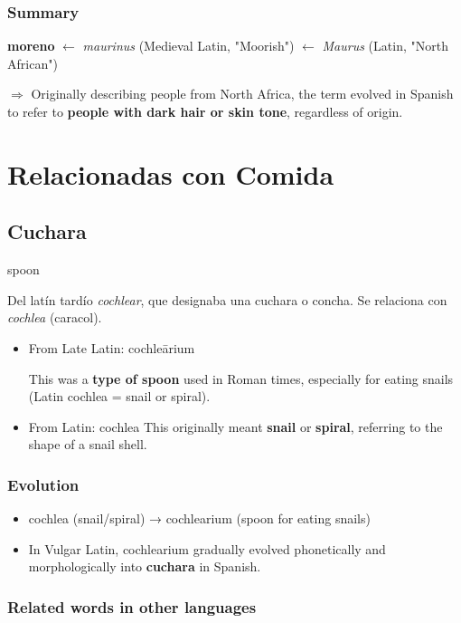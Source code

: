 \documentclass[10pt]{book}
\newcommand{\wordentry}[2]{
	\large #1
	\vspace{-0.5em}
	\begin{etymologybox}
		#2
	\end{etymologybox}
}
\let\oldsection\section
\renewcommand{\section}[1]{
	\needspace{8\baselineskip}
	\oldsection{#1}
}
\begin{document}
	\subsection*{Summary}
	\textbf{moreno} $\leftarrow$ \textit{maurinus} (Medieval Latin, "Moorish") $\leftarrow$ \textit{Maurus} (Latin, "North African")
	
	$\Rightarrow$ Originally describing people from North Africa, the term evolved in Spanish to refer to \textbf{people with dark hair or skin tone}, regardless of origin.
	
	
	\chapter{Relacionadas con Comida}
	
	\section{Cuchara}
	\wordentry{spoon}{
	Del latín tardío \textit{cochlear}, que designaba una cuchara o concha. Se relaciona con \textit{cochlea} (caracol).
	\begin{itemize}
		\item From Late Latin: cochleārium
		
		This was a \textbf{type of spoon} used in Roman times, especially for eating snails (Latin cochlea = snail or spiral).
		
		\item From Latin: cochlea
		This originally meant \textbf{snail} or \textbf{spiral}, referring to the shape of a snail shell.
	\end{itemize}
	}
	
	\subsection*{Evolution}
	\begin{itemize}
		\item cochlea (snail/spiral) → cochlearium (spoon for eating snails)
		
		\item In Vulgar Latin, cochlearium gradually evolved phonetically and morphologically into \textbf{cuchara} in Spanish.
	\end{itemize}
	
	\subsection*{Related words in other languages}
	
\end{document}

